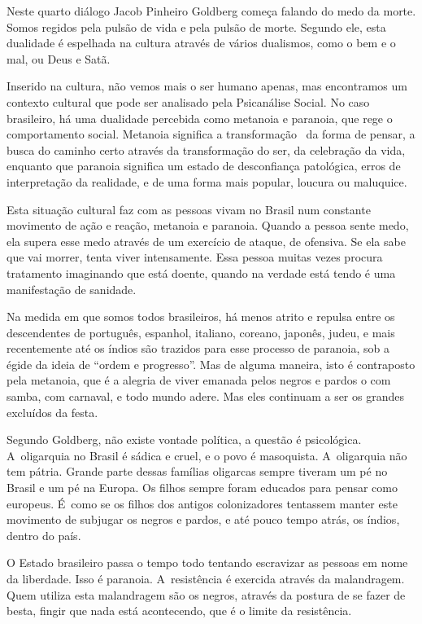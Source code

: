  

Neste quarto diálogo Jacob Pinheiro Goldberg começa falando do medo da
morte. Somos regidos pela pulsão de vida e pela pulsão de morte. Segundo
ele, esta dualidade é espelhada na cultura através de vários dualismos,
como o bem e o mal, ou Deus e Satã.

Inserido na cultura, não vemos mais o ser humano apenas, mas encontramos
um contexto cultural que pode ser analisado pela Psicanálise Social. No
caso brasileiro, há uma dualidade percebida como metanoia e paranoia,
que rege o comportamento social. Metanoia significa a transformação~ da
forma de pensar, a busca do caminho certo através da transformação do
ser, da celebração da vida, enquanto que paranoia significa um estado de
desconfiança patológica, erros de interpretação da realidade, e de uma
forma mais popular, loucura ou maluquice.

Esta situação cultural faz com as pessoas vivam no Brasil num constante
movimento de ação e reação, metanoia e paranoia. Quando a pessoa sente
medo, ela supera esse medo através de um exercício de ataque, de
ofensiva. Se ela sabe que vai morrer, tenta viver intensamente. Essa
pessoa muitas vezes procura tratamento imaginando que está doente,
quando na verdade está tendo é uma manifestação de sanidade.

Na medida em que somos todos brasileiros, há menos atrito e repulsa
entre os descendentes de português, espanhol, italiano, coreano,
japonês, judeu, e mais recentemente até os índios são trazidos para esse
processo de paranoia, sob a égide da ideia de ``ordem e progresso''. Mas
de alguma maneira, isto é contraposto pela metanoia, que é a alegria de
viver emanada pelos negros e pardos o com samba, com carnaval, e todo
mundo adere. Mas eles continuam a ser os grandes excluídos da festa.

Segundo Goldberg, não existe vontade política, a questão é psicológica.
A~oligarquia no Brasil é sádica e cruel, e o povo é masoquista. A~oligarquia não tem pátria. Grande parte dessas famílias oligarcas sempre
tiveram um pé no Brasil e um pé na Europa. Os filhos sempre foram
educados para pensar como europeus. É~como se os filhos dos antigos
colonizadores tentassem manter este movimento de subjugar os negros e
pardos, e até pouco tempo atrás, os índios, dentro do país.

O Estado brasileiro passa o tempo todo tentando escravizar as pessoas em
nome da liberdade. Isso é paranoia. A~resistência é exercida através da
malandragem. Quem utiliza esta malandragem são os negros, através da
postura de se fazer de besta, fingir que nada está acontecendo, que é o
limite da resistência.

